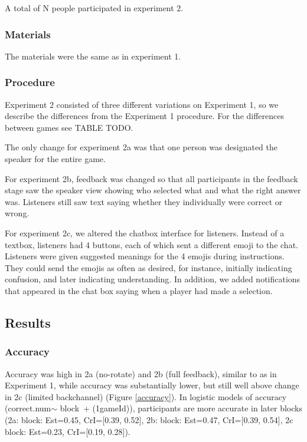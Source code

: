 \documentclass[
  english,
  a4paper,
]{article}
\begin{document}
A total of N people participated in experiment 2.

\hypertarget{materials-1}{%
\subsubsection{Materials}\label{materials-1}}

The materials were the same as in experiment 1.

\hypertarget{procedure-1}{%
\subsubsection{Procedure}\label{procedure-1}}

Experiment 2 consisted of three different variations on Experiment 1, so we describe the differences from the Experiment 1 procedure. For the differences between games see TABLE TODO.

The only change for experiment 2a was that one person was designated the speaker for the entire game.

For experiment 2b, feedback was changed so that all participants in the feedback stage saw the speaker view showing who selected what and what the right answer was. Listeners still saw text saying whether they individually were correct or wrong.

For experiment 2c, we altered the chatbox interface for listeners. Instead of a textbox, listeners had 4 buttons, each of which sent a different emoji to the chat. Listeners were given suggested meanings for the 4 emojis during instructions. They could send the emojis as often as desired, for instance, initially indicating confusion, and later indicating understanding. In addition, we added notifications that appeared in the chat box saying when a player had made a selection.

\hypertarget{results-1}{%
\subsection{Results}\label{results-1}}

\hypertarget{accuracy-1}{%
\subsubsection{Accuracy}\label{accuracy-1}}

Accuracy was high in 2a (no-rotate) and 2b (full feedback), similar to as in Experiment 1, while accuracy was substantially lower, but still well above change in 2c (limited backchannel) (Figure \ref{accuracy}). In logistic models of accuracy (correct.num\(\sim\) block~+ (1\textbar gameId)), participants are more accurate in later blocks (2a: block: Est=0.45, CrI={[}0.39, 0.52{]}, 2b: block: Est=0.47, CrI={[}0.39, 0.54{]}, 2c block: Est=0.23, CrI={[}0.19, 0.28{]}).
\end{document}
